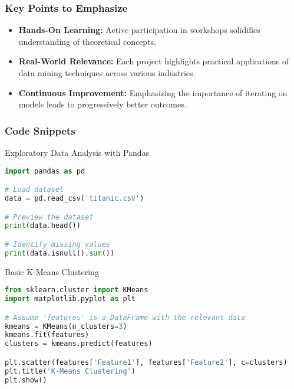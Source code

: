 \documentclass[aspectratio=169]{beamer}
\begin{document}
\begin{frame}[fragile]
    \frametitle{Key Points to Emphasize}
    \begin{itemize}
        \item \textbf{Hands-On Learning:} Active participation in workshops solidifies understanding of theoretical concepts.
        \item \textbf{Real-World Relevance:} Each project highlights practical applications of data mining techniques across various industries.
        \item \textbf{Continuous Improvement:} Emphasizing the importance of iterating on models leads to progressively better outcomes.
    \end{itemize}
\end{frame}

\begin{frame}[fragile]
    \frametitle{Code Snippets}
    \begin{block}{Exploratory Data Analysis with Pandas}
    \begin{lstlisting}[language=Python]
import pandas as pd

# Load dataset
data = pd.read_csv('titanic.csv')

# Preview the dataset
print(data.head())

# Identify missing values
print(data.isnull().sum())
    \end{lstlisting}
    \end{block}
    
    \begin{block}{Basic K-Means Clustering}
    \begin{lstlisting}[language=Python]
from sklearn.cluster import KMeans
import matplotlib.pyplot as plt

# Assume 'features' is a DataFrame with the relevant data
kmeans = KMeans(n_clusters=3)
kmeans.fit(features)
clusters = kmeans.predict(features)

plt.scatter(features['Feature1'], features['Feature2'], c=clusters)
plt.title('K-Means Clustering')
plt.show()
    \end{lstlisting}
    \end{block}
\end{frame}
\end{document}
